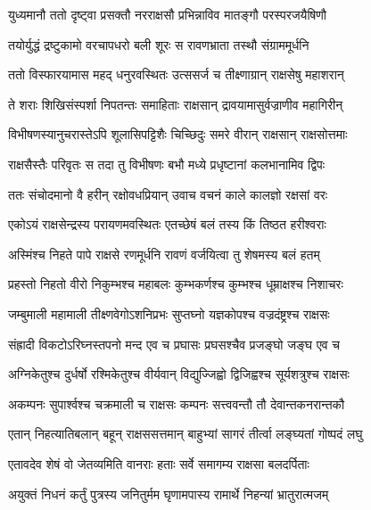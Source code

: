 
\twolineshloka
{युध्यमानौ ततो दृष्ट्वा प्रसक्तौ नरराक्षसौ}
{प्रभिन्नाविव मातङ्गौ परस्परजयैषिणौ} %

\twolineshloka
{तयोर्युद्धं द्रष्टुकामो वरचापधरो बली}
{शूरः स रावणभ्राता तस्थौ संग्राममूर्धनि} %

\twolineshloka
{ततो विस्फारयामास महद् धनुरवस्थितः}
{उत्ससर्ज च तीक्ष्णाग्रान् राक्षसेषु महाशरान्} %

\twolineshloka
{ते शराः शिखिसंस्पर्शा निपतन्तः समाहिताः}
{राक्षसान् द्रावयामासुर्वज्राणीव महागिरीन्} %

\twolineshloka
{विभीषणस्यानुचरास्तेऽपि शूलासिपट्टिशैः}
{चिच्छिदुः समरे वीरान् राक्षसान् राक्षसोत्तमाः} %

\twolineshloka
{राक्षसैस्तैः परिवृतः स तदा तु विभीषणः}
{बभौ मध्ये प्रधृष्टानां कलभानामिव द्विपः} %

\twolineshloka
{ततः संचोदमानो वै हरीन् रक्षोवधप्रियान्}
{उवाच वचनं काले कालज्ञो रक्षसां वरः} %

\twolineshloka
{एकोऽयं राक्षसेन्द्रस्य परायणमवस्थितः}
{एतच्छेषं बलं तस्य किं तिष्ठत हरीश्वराः} %

\twolineshloka
{अस्मिंश्च निहते पापे राक्षसे रणमूर्धनि}
{रावणं वर्जयित्वा तु शेषमस्य बलं हतम्} %

\twolineshloka
{प्रहस्तो निहतो वीरो निकुम्भश्च महाबलः}
{कुम्भकर्णश्च कुम्भश्च धूम्राक्षश्च निशाचरः} %

\twolineshloka
{जम्बुमाली महामाली तीक्ष्णवेगोऽशनिप्रभः}
{सुप्तघ्नो यज्ञकोपश्च वज्रदंष्ट्रश्च राक्षसः} %

\twolineshloka
{संह्रादी विकटोऽरिघ्नस्तपनो मन्द एव च}
{प्रघासः प्रघसश्चैव प्रजङ्घो जङ्घ एव च} %

\twolineshloka
{अग्निकेतुश्च दुर्धर्षो रश्मिकेतुश्च वीर्यवान्}
{विद्युज्जिह्वो द्विजिह्वश्च सूर्यशत्रुश्च राक्षसः} %

\twolineshloka
{अकम्पनः सुपार्श्वश्च चक्रमाली च राक्षसः}
{कम्पनः सत्त्ववन्तौ तौ देवान्तकनरान्तकौ} %

\twolineshloka
{एतान् निहत्यातिबलान् बहून् राक्षससत्तमान्}
{बाहुभ्यां सागरं तीर्त्वा लङ्घ्यतां गोष्पदं लघु} %

\twolineshloka
{एतावदेव शेषं वो जेतव्यमिति वानराः}
{हताः सर्वे समागम्य राक्षसा बलदर्पिताः} %

\twolineshloka
{अयुक्तं निधनं कर्तुं पुत्रस्य जनितुर्मम}
{घृणामपास्य रामार्थे निहन्यां भ्रातुरात्मजम्} %

